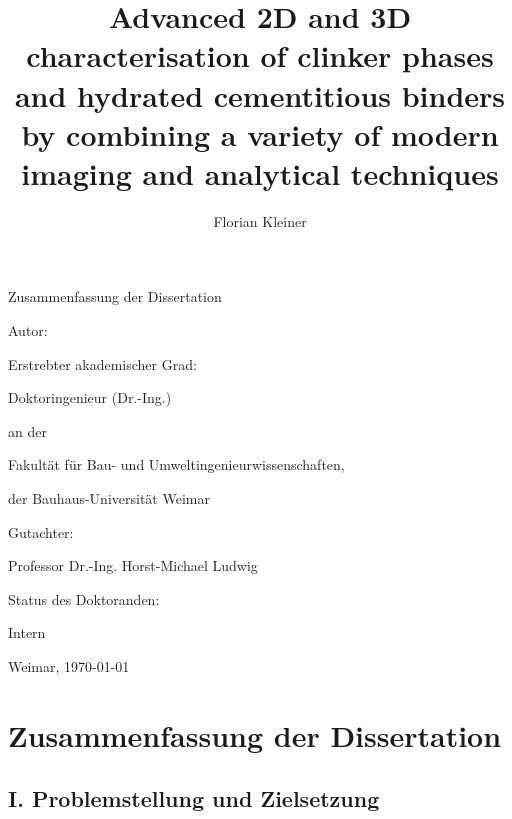 \documentclass[11pt, a4paper]{article}
\title{Advanced 2D and 3D characterisation of clinker phases and hydrated cementitious binders by combining a variety of modern imaging and analytical techniques}
\author{Florian Kleiner}
\begin{document}
\begin{titlepage}
    \centering
    \vspace*{1cm}
    
    {\Large Zusammenfassung der Dissertation\par}
    \vspace{1.5cm}
    
    {\LARGE \textbf{\thetitle}\par}
    \vspace{2cm}
    
    {\large Autor:\par}
    {\Large \theauthor\par}
    \vspace{1cm}
    
    {\large Erstrebter akademischer Grad:\par}
    {\Large Doktoringenieur (Dr.-Ing.)\par}
    \vspace{1cm}
    
    { an der\par}
    {\large Fakultät für Bau- und Umweltingenieurwissenschaften,\par}
    {\large der Bauhaus-Universität Weimar\par}
    \vspace{1cm}

    {\large Gutachter:\par}
    {\Large Professor Dr.-Ing. Horst-Michael Ludwig\par}
    \vspace{1cm}
    
    {\large Status des Doktoranden:\par}
    {\Large Intern\par}
    \vspace{3cm}
    
    \vfill
    
    {\large Weimar, \today\par}
\end{titlepage}

\newpage

\section*{Zusammenfassung der Dissertation}

\subsection*{I. Problemstellung und Zielsetzung}
\end{document}
